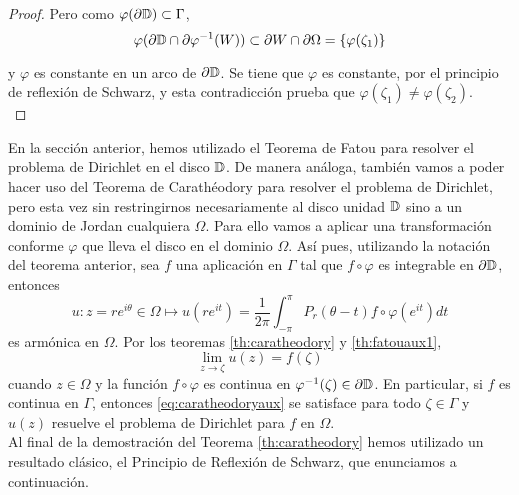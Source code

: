 \begin{proof}
    Pero como $\varphi(\partial \mathbb{D}) \subset \Gamma$,
    \begin{equation*}
        \varphi(\partial \mathbb{D} \cap \partial \varphi ^{-1} (W)) \subset \partial W \cap \partial \Omega = \{ \varphi (\zeta_1)\}
    \end{equation*}

    y $\varphi$ es constante en un arco de $\partial \mathbb{D}$. Se tiene que $\varphi$ es constante, por el principio de reflexión de Schwarz, y esta contradicción prueba que $\varphi(\zeta_1) \not = \varphi(\zeta_2)$. \\
\end{proof}

En la sección anterior, hemos utilizado el Teorema de Fatou para resolver el problema de Dirichlet en el disco $\mathbb{D}$. De manera análoga, también vamos a poder hacer uso del Teorema de Carathéodory para resolver el problema de Dirichlet, pero esta vez sin restringirnos necesariamente al disco unidad $\mathbb{D}$ sino a un dominio de Jordan cualquiera $\Omega$. Para ello vamos a aplicar una transformación conforme $\varphi$ que lleva el disco en el dominio $\Omega$. Así pues, utilizando la notación del teorema anterior, sea $f$ una aplicación en $\Gamma$ tal que $f \circ \varphi$ es integrable en $\partial \mathbb{D}$, entonces
\begin{equation*}
    u: z=re^{i \theta} \in \Omega \mapsto u(re^{it}) = \dfrac{1}{2 \pi} \int_{- \pi}^{\pi} P_r (\theta - t) f \circ \varphi (e^{it}) dt
\end{equation*}
es armónica en $\Omega$. Por los teoremas \ref{th:caratheodory} y \ref{th:fatouaux1},
\begin{equation}
    \label{eq:caratheodoryaux}
    \lim_{z \to \zeta} u(z) = f(\zeta)
\end{equation}
cuando $z \in \Omega$ y la función $f \circ \varphi$ es continua en $\varphi^{-1}(\zeta) \in \partial \mathbb{D}$. En particular, si $f$ es continua en $\Gamma$, entonces \eqref{eq:caratheodoryaux} se satisface para todo $\zeta \in \Gamma$ y $u(z)$ resuelve el problema de Dirichlet para $f$ en $\Omega$. \\


Al final de la demostración del Teorema \ref{th:caratheodory} hemos utilizado un resultado clásico, el Principio de Reflexión de Schwarz, que enunciamos a continuación. \\


